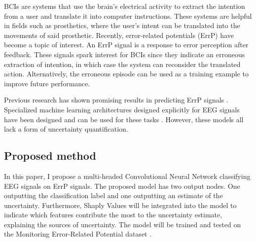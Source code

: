BCIs are systems that use the brain's electrical activity to extract the intention from a user and translate it into computer instructions. These systems are helpful in fields such as prosthetics, where the user's intent can be translated into the movements of said prosthetic. Recently, error-related potentials (ErrP) have become a topic of interest. An ErrP signal is a response to error perception after feedback. These signals spark interest for BCIs since they indicate an erroneous extraction of intention, in which case the system can reconsider the translated action. Alternatively, the erroneous episode can be used as a training example to improve future performance. 

Previous research has shown promising results in predicting ErrP signals \citep{correia2021error}. Specialized machine learning architectures designed explicitly for EEG signals have been designed and can be used for these tasks \citep{lawhern2018eegnet}. However, these models all lack a form of uncertainty quantification.

\subsection{Proposed method}

In this paper, I propose a multi-headed Convolutional Neural Network classifying EEG signals on ErrP signals. The proposed model has two output nodes. One outputting the classification label and one outputting an estimate of the uncertainty. Furthermore, Shaply Values will be integrated into the model to indicate which features contribute the most to the uncertainty estimate, explaining the sources of uncertainty. The model will be trained and tested on the Monitoring Error-Related Potential dataset \citep{chavarriaga2010learning}.
